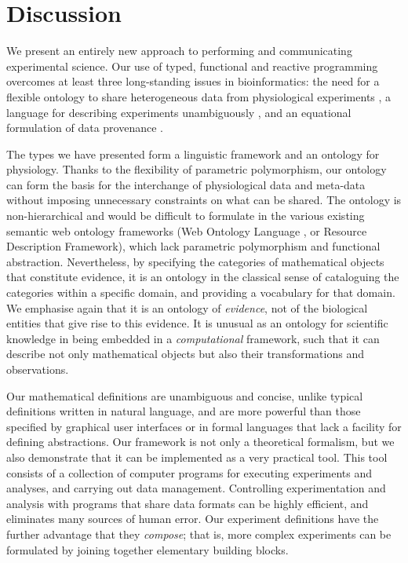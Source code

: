\section{Discussion}

We present an entirely new approach to performing and communicating
experimental science.  Our use of
typed, functional and reactive programming overcomes at least three
long-standing issues in bioinformatics: the need for a flexible
ontology to share heterogeneous data from physiological experiments
\cite{Amari2002}, a language for describing experiments unambiguously
\cite{Murray-Rust2002}, and an equational formulation of data
provenance \cite{Pool2002}. 

The types we have presented form a linguistic framework and an
ontology for physiology. Thanks to the flexibility of parametric
polymorphism, our ontology can form the basis for the interchange of
physiological data and meta-data without imposing unnecessary
constraints on what can be shared. The ontology is non-hierarchical
and would be difficult to formulate in the various existing semantic
web ontology frameworks (Web Ontology Language \cite{owlref}, or
Resource Description Framework), which lack parametric polymorphism
and functional abstraction. Nevertheless, by specifying the categories
of mathematical objects that constitute evidence, it is an ontology in
the classical sense of cataloguing the categories within a specific
domain, and providing a vocabulary for that domain. We emphasise again
that it is an ontology of \emph{evidence}, not of the biological
entities that give rise to this evidence. It is unusual as an ontology
for scientific knowledge in being embedded in a \emph{computational}
framework, such that it can describe not only mathematical objects but
also their transformations and observations.

%
% 
%
Our mathematical definitions are unambiguous and concise, unlike
typical definitions written in natural language, and are more powerful
than those specified by graphical user interfaces or in formal
languages that lack a facility for defining abstractions. Our
framework is not only a theoretical formalism, but we also demonstrate
that it can be implemented as a very practical tool. This tool
consists of a collection of computer programs for executing
experiments and analyses, and carrying out data
management. Controlling experimentation and analysis with programs
that share data formats can be highly efficient, and eliminates many
sources of human error. Our experiment definitions have the further
advantage that they \emph{compose}; that is, more complex experiments
can be formulated by joining together elementary building blocks.

